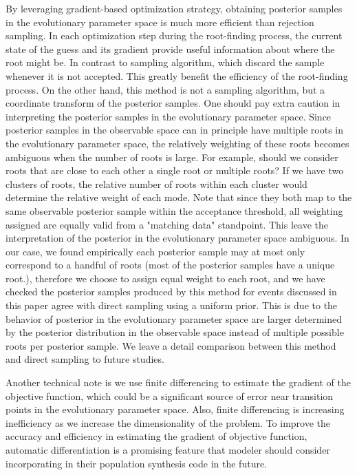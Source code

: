 \documentclass[twocolumn]{aastex631}
\begin{document}
By leveraging gradient-based optimization strategy, obtaining posterior samples in the evolutionary parameter space is much more efficient than rejection sampling.
In each optimization step during the root-finding process, the current state of the guess and its gradient provide useful information about where the root might be.
In contrast to sampling algorithm, which discard the sample whenever it is not accepted.
This greatly benefit the efficiency of the root-finding process.
On the other hand, this method is not a sampling algorithm, but a coordinate transform of the posterior samples.
One should pay extra caution in interpreting the posterior samples in the evolutionary parameter space.
Since posterior samples in the observable space can in principle have multiple roots in the evolutionary parameter space,
the relatively weighting of these roots becomes ambiguous when the number of roots is large.
For example, should we consider roots that are close to each other a single root or multiple roots?
If we have two clusters of roots, the relative number of roots within each cluster would determine the relative weight of each mode.
Note that since they both map to the same observable posterior sample within the acceptance threshold, all weighting assigned are equally valid from a "matching data" standpoint.
This leave the interpretation of the posterior in the evolutionary parameter space ambiguous.
In our case, we found empirically each posterior sample may at most only correspond to a handful of roots (most of the posterior samples have a unique root.), therefore we choose to assign equal weight to each root,
and we have checked the posterior samples produced by this method for events discussed in this paper agree with direct sampling using a uniform prior.
This is due to the behavior of posterior in the evolutionary parameter space are larger determined by the posterior distribution in the observable space instead of multiple possible roots per posterior sample.
We leave a detail comparison between this method and direct sampling to future studies.

Another technical note is we use finite differencing to estimate the gradient of the objective function, which could be a significant source of error near transition points in the evolutionary parameter space.
Also, finite differencing is increasing inefficiency as we increase the dimensionality of the problem.
To improve the accuracy and efficiency in estimating the gradient of objective function, automatic differentiation is a promising feature that modeler should consider incorporating in their population synthesis code in the future.
\end{document}
